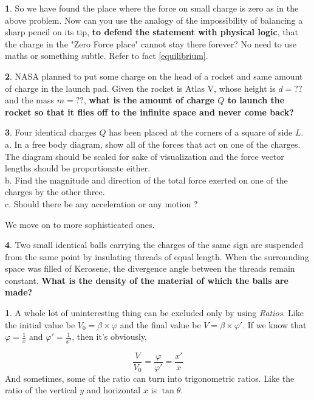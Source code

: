 \documentclass[11pt,a4paper,landscape,twocolumn]{article}
\theoremstyle{definition}
\theoremstyle{definition}
\newtheorem{pr}{ \framebox[0.05\textwidth]{{\sffamily Pr}} }
\theoremstyle{definition}
\newtheorem{idea}{ \framebox[0.05\textwidth]{{\sffamily Idea}} }
\theoremstyle{definition}
\begin{document}
\begin{pr}

So we have found the place where the force on small charge is zero as in the above problem. Now can you use the analogy of the impossibility of balancing a sharp pencil on its tip, \textbf{to defend the statement with physical logic}, that the charge in the "Zero Force place" cannot stay there forever? No need to use maths or something subtle. Refer to fact \ref{equilibrium}.

\end{pr}

\begin{pr}
NASA planned to put some charge on the head of a rocket and same amount of charge in the launch pad. Given the rocket is Atlas V, whose  height is $d = ??$ and the mass $m = ??$, \textbf{what is the amount of charge $Q$ to launch the rocket so that it flies off to the infinite space and never come back?}
\end{pr}

\begin{pr}
Four identical charges $Q$ has been placed at the corners of a square of side $L$. \\
a. In a free body diagram, show all of the forces that act on one of the charges. The diagram should be scaled for sake of visualization and the force vector lengths should be proportionate either. \\
b. Find the magnitude and direction of the total force exerted on one of the charges by the other three.\\
c. Should there be any acceleration or any motion ?
\end{pr}



We move on to more sophisticated ones.


\begin{pr}
Two small identical balls carrying the charges of the same sign are suspended from the same point by insulating threads of equal length. When the surrounding space was filled of Kerosene, the divergence angle between the threads remain constant. \textbf{What is the density of the material of which the balls are made?}
\end{pr}

\begin{idea} \label{ratio}
A whole lot of uninteresting thing can be excluded only by using \emph{Ratios}. Like the initial value be $V_0 = \beta \times \varphi$ and the final value be $V = \beta \times \varphi'$. If we know that $\varphi = \frac{1}{x}$ and $\varphi'=\frac{1}{x'}$, then it's obviously, 

\[ \frac{V}{V_0} = \frac{\varphi}{\varphi'} = \frac{x'}{x} \]
And sometimes, some of the ratio can turn into trigonometric ratios. Like the ratio of the vertical $y$ and horizontal $x$ is $\tan \theta$. 
\end{idea}
\end{document}
